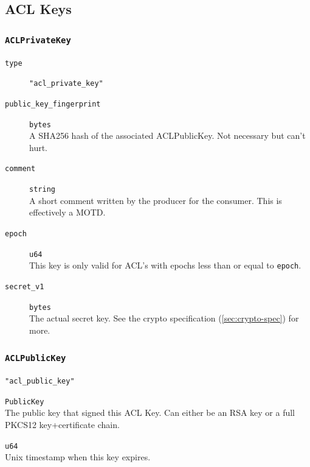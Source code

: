 \documentclass[pdftex,12pt,a4papaer,twoside,notitlepage]{report}
\begin{document}
\begin{appendices}
\subsection{ACL Keys}

\subsubsection{\texttt{ACLPrivateKey}}

\begin{leftbar}
\begin{description}
\item[\texttt{type}] \verb="acl_private_key"=
\item[\texttt{public\_key\_fingerprint}] \texttt{bytes} \\
  A SHA256 hash of the associated ACLPublicKey. Not necessary but can't hurt.

\item[\texttt{comment}] \texttt{string} \\
  A short comment written by the producer for the consumer. This is effectively a MOTD.
\item[\texttt{epoch}] \texttt{u64} \\
  This key is only valid for ACL's with epochs less than or equal to \texttt{epoch}.
\item[\texttt{secret\_v1}] \texttt{bytes} \\
  The actual secret key. See the crypto specification (\cref{sec:crypto-spec})
  for more.
\end{description}
\end{leftbar}

\subsubsection{\texttt{ACLPublicKey}}

\begin{leftbar}
\begin{description}[labelindent=2em,leftmargin=3em]
\item[\texttt{type}] \verb="acl_public_key"=
\item[\texttt{signing\_key}] \texttt{PublicKey} \\
  The public key that signed this ACL Key. Can either be an RSA key or a
  full PKCS12 key+certificate chain.

\item[\texttt{expires}] \texttt{u64} \\
  Unix timestamp when this key expires.


\end{description}
\end{leftbar}
\end{appendices}
\end{document}
